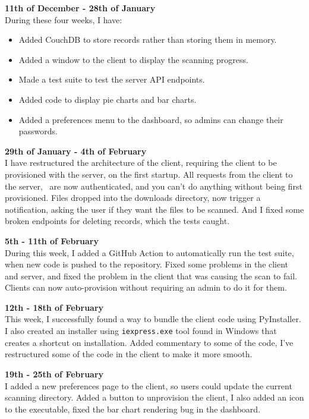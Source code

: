 \textbf{11th of December - 28th of January} \\
During these four weeks, I have:
\begin{itemize}
    \item Added CouchDB to store records rather than storing them in memory.
    \item Added a window to the client to display the scanning progress.
    \item Made a test suite to test the server API endpoints.
    \item Added code to display pie charts and bar charts.
    \item Added a preferences menu to the dashboard,
    so admins can change their passwords.
\end{itemize}

\textbf{29th of January - 4th of February} \\
I have restructured the architecture of the client,
requiring the client to be provisioned with the server, on the first startup.
All requests from the client to the server, 
are now authenticated, and you can't do anything without being first provisioned.
Files dropped into the downloads directory, now trigger a notification,
asking the user if they want the files to be scanned.
And I fixed some broken endpoints for deleting records, which the tests caught.

\textbf{5th - 11th of February} \\
During this week, I added a GitHub Action to automatically run the test suite,
when new code is pushed to the repository.
Fixed some problems in the client and server,
and fixed the problem in the client that was causing the scan to fail.
Clients can now auto-provision without requiring an admin to do it for them.

\textbf{12th - 18th of February} \\
This week, I successfully found a way to bundle the client code using PyInstaller.
I also created an installer using \texttt{iexpress.exe} tool found in Windows
that creates a shortcut on installation.
Added commentary to some of the code,
I've restructured some of the code in the client to make it more smooth.

\textbf{19th - 25th of February} \\
I added a new preferences page to the client,
so users could update the current scanning directory.
Added a button to unprovision the client, I also added an icon to the executable,
fixed the bar chart rendering bug in the dashboard.

